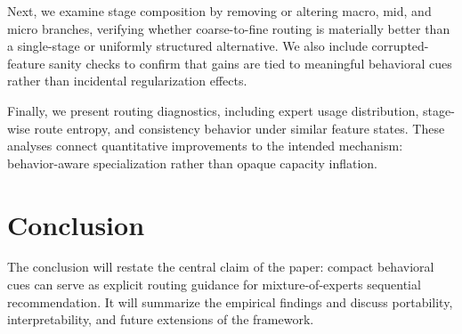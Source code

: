 \documentclass[sigconf,anonymous,review]{acmart-primary/acmart}
\begin{document}
Next, we examine stage composition by removing or altering macro, mid, and micro branches, verifying whether coarse-to-fine routing is materially better than a single-stage or uniformly structured alternative. We also include corrupted-feature sanity checks to confirm that gains are tied to meaningful behavioral cues rather than incidental regularization effects.

Finally, we present routing diagnostics, including expert usage distribution, stage-wise route entropy, and consistency behavior under similar feature states. These analyses connect quantitative improvements to the intended mechanism: behavior-aware specialization rather than opaque capacity inflation.

\section{Conclusion}
\label{sec:conclusion}
The conclusion will restate the central claim of the paper: compact behavioral cues can serve as explicit routing guidance for mixture-of-experts sequential recommendation. It will summarize the empirical findings and discuss portability, interpretability, and future extensions of the framework.



\end{document}
